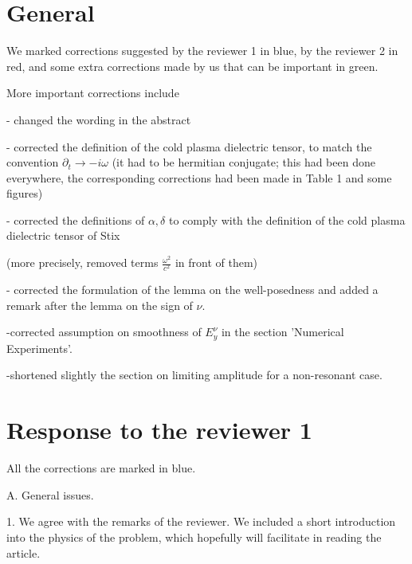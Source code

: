 \documentclass[a4paper,10pt]{article}
\title{}
\author{}
\begin{document}
\maketitle

\begin{abstract}

\end{abstract}

\section{General}

We marked corrections suggested by the reviewer 1 in blue, by the reviewer 2 in red, 
and some extra corrections made by us that can be important in green.

More important corrections include

- changed the wording in the abstract

- corrected the definition of the cold plasma dielectric tensor, to match the convention $\partial_t\rightarrow -i\omega$ (it had to be hermitian conjugate; 
this had been done everywhere, the corresponding corrections had been made in Table 1 and some figures)

- corrected the definitions of $\alpha,\delta$ to comply with the definition of the cold plasma dielectric tensor of Stix 

(more precisely, removed terms $\frac{\omega^2}{c^2}$ in 
front of them)

- corrected the formulation of the lemma on the well-posedness and added a remark after the lemma on the sign of $\nu$.

-corrected assumption on smoothness of $E_y^{\nu}$ in the section 'Numerical Experiments'.

-shortened slightly the section on limiting amplitude for a non-resonant case.



\section{Response to the reviewer 1}

All the corrections are marked in blue. 

A. General issues.

1. We agree with the remarks of the reviewer. We included a short introduction into the physics of the problem, 
which hopefully will facilitate in reading the article. 
\end{document}
